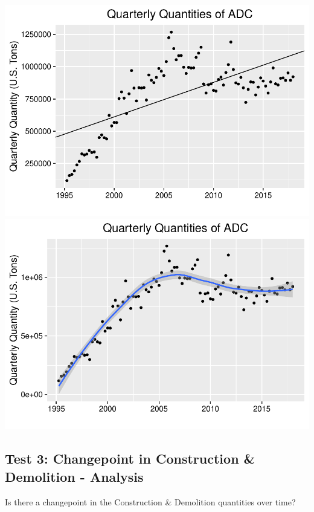 \documentclass[12pt,]{article}
\begin{document}
\includegraphics{SKo_Project_Template_files/figure-latex/Test2_2-1.pdf}
\includegraphics{SKo_Project_Template_files/figure-latex/Test2_2-2.pdf}

\subsection{Test 3: Changepoint in Construction \& Demolition -
Analysis}\label{test-3-changepoint-in-construction-demolition---analysis}

Is there a changepoint in the Construction \& Demolition quantities over
time?
\end{document}
